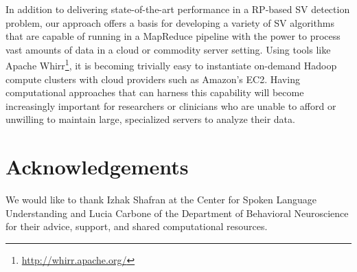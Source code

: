 \documentclass[11pt]{article}
\begin{document}
In addition to delivering state-of-the-art performance in a RP-based SV detection problem, our approach offers a basis for developing a variety of SV algorithms that are capable of running in a MapReduce pipeline with the power to process vast amounts of data in a cloud or commodity server setting. Using tools like Apache Whirr\footnote{\url{http://whirr.apache.org/}}, it is becoming trivially easy to instantiate on-demand Hadoop compute clusters with cloud providers such as Amazon's EC2. Having computational approaches that can harness this capability will become increasingly important for researchers or clinicians who are unable to afford or unwilling to maintain large, specialized servers to analyze their data.

\newpage

\section*{Acknowledgements}

We would like to thank Izhak Shafran at the Center for Spoken Language Understanding and Lucia Carbone of the Department of Behavioral Neuroscience for their advice, support, and shared computational resources.

\printbibliography
\end{document}
